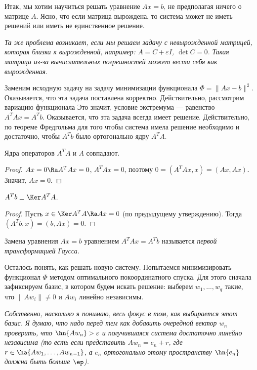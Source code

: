 \documentclass[a4paper]{article}
\begin{document}
Итак, мы хотим научиться решать уравнение $Ax=b$, не предполагая
ничего о матрице $A$. Ясно, что если матрица вырождена, то система
может не иметь решений или иметь не единственное решение.

\textsl{Та же проблема возникает, если мы решаем задачу с невырожденной
матрицей, которая близка к вырожденной, например: $A=C+\varepsilon
I$, $\det C=0$. Такая матрица из-за вычислительных погрешностей
может вести себя как вырожденная.}

Заменим исходную задачу на задачу минимизации функционала
$\Phi=\|Ax-b\|^2$. Оказывается, что эта задача поставлена корректно.
Действительно, рассмотрим вариацию функционала
 Это значит, условие экстремума ---
равенство $A^TAx=A^Tb$. Оказывается, что эта задача всегда имеет
решение. Действительно, по теореме Фредгольма для того чтобы система
имела решение необходимо и достаточно, чтобы $A^Tb$ было
ортогонально ядру $A^TA$.

\begin{stm}
Ядра операторов $A^TA$ и $A$ совпадают.
\end{stm}
\begin{proof}
$Ax=0 \Ra A^TAx=0$, $A^TAx=0$, поэтому $0=(A^TAx,x)=(Ax,Ax)$. Значит, $Ax=0$.
\end{proof}

\begin{stm}
$A^Tb \perp \Ker A^TA$.
\end{stm}
\begin{proof}
Пусть $x\in \Ker A^TA \Ra Ax=0$ (по предыдущему утверждению). Тогда $(A^Tb, x)=(b, Ax)=0$.
\end{proof}

Замена уравнения $Ax=b$ уравнением $A^TAx=A^Tb$ называется \emph{первой трансформацией Гаусса}.

Осталось понять, как решать новую систему. Попытаемся минимизировать
функционал $\Phi$ методом оптимального покоординатного спуска. Для
этого сначала зафиксируем базис, в котором будем искать решение:
выберем $w_1, \dots, w_q$ такие, что $\|Aw_i\|\ne0$ и $Aw_i$ линейно
независимы.

 \textsl{Собственно, насколько я понимаю, весь фокус в том,
как выбирается этот базис. Я думаю, что надо перед тем как добавить
очередной вектор $w_n$ проверить, что $\hn{Aw_n} > \varepsilon$  и
получившаяся система достаточно линейно независима (то есть если
представить $Aw_n=e_n+r$, где $r\in \ha{Aw_1,\dots,Aw_{n-1}}$, а $e_n$ ортогонально этому пространству
$\hn{e_n}$ должна быть больше $\ep$).}
\end{document}
